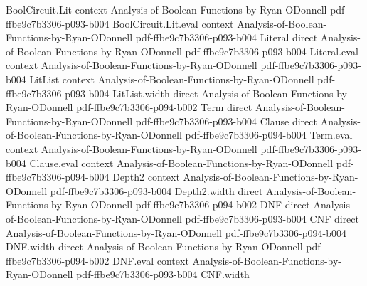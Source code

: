 \begin{theorem}
\label{BooleanAnalysis.noiseOp_fourier}
\leanok
{}
\proofstep
  {BoolCircuit.Lit}
  {context}
  {Analysis-of-Boolean-Functions-by-Ryan-ODonnell}
  {pdf-ffbe9c7b3306-p093-b004}
\proofstep
  {BoolCircuit.Lit.eval}
  {context}
  {Analysis-of-Boolean-Functions-by-Ryan-ODonnell}
  {pdf-ffbe9c7b3306-p093-b004}
\proofstep
  {Literal}
  {direct}
  {Analysis-of-Boolean-Functions-by-Ryan-ODonnell}
  {pdf-ffbe9c7b3306-p093-b004}
\proofstep
  {Literal.eval}
  {context}
  {Analysis-of-Boolean-Functions-by-Ryan-ODonnell}
  {pdf-ffbe9c7b3306-p093-b004}
\proofstep
  {LitList}
  {context}
  {Analysis-of-Boolean-Functions-by-Ryan-ODonnell}
  {pdf-ffbe9c7b3306-p093-b004}
\proofstep
  {LitList.width}
  {direct}
  {Analysis-of-Boolean-Functions-by-Ryan-ODonnell}
  {pdf-ffbe9c7b3306-p094-b002}
\proofstep
  {Term}
  {direct}
  {Analysis-of-Boolean-Functions-by-Ryan-ODonnell}
  {pdf-ffbe9c7b3306-p093-b004}
\proofstep
  {Clause}
  {direct}
  {Analysis-of-Boolean-Functions-by-Ryan-ODonnell}
  {pdf-ffbe9c7b3306-p094-b004}
\proofstep
  {Term.eval}
  {context}
  {Analysis-of-Boolean-Functions-by-Ryan-ODonnell}
  {pdf-ffbe9c7b3306-p093-b004}
\proofstep
  {Clause.eval}
  {context}
  {Analysis-of-Boolean-Functions-by-Ryan-ODonnell}
  {pdf-ffbe9c7b3306-p094-b004}
\proofstep
  {Depth2}
  {context}
  {Analysis-of-Boolean-Functions-by-Ryan-ODonnell}
  {pdf-ffbe9c7b3306-p093-b004}
\proofstep
  {Depth2.width}
  {direct}
  {Analysis-of-Boolean-Functions-by-Ryan-ODonnell}
  {pdf-ffbe9c7b3306-p094-b002}
\proofstep
  {DNF}
  {direct}
  {Analysis-of-Boolean-Functions-by-Ryan-ODonnell}
  {pdf-ffbe9c7b3306-p093-b004}
\proofstep
  {CNF}
  {direct}
  {Analysis-of-Boolean-Functions-by-Ryan-ODonnell}
  {pdf-ffbe9c7b3306-p094-b004}
\proofstep
  {DNF.width}
  {direct}
  {Analysis-of-Boolean-Functions-by-Ryan-ODonnell}
  {pdf-ffbe9c7b3306-p094-b002}
\proofstep
  {DNF.eval}
  {context}
  {Analysis-of-Boolean-Functions-by-Ryan-ODonnell}
  {pdf-ffbe9c7b3306-p093-b004}
\proofstep
  {CNF.width}

\end{theorem}
